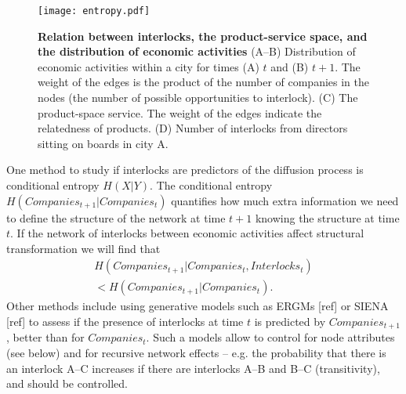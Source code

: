 \begin{figure}
\begin{center}
\texttt{[image: entropy.pdf]}
\caption{\textbf{Relation between interlocks, the product-service space, and the distribution of economic activities} (A--B) Distribution of economic activities within a city for times (A) $t$ and (B) $t+1$. The weight of the edges is the product of the number of companies in the nodes (the number of possible opportunities to interlock). (C) The product-space service. The weight of the edges indicate the relatedness of products. (D) Number of interlocks from directors sitting on boards in city A.}
\label{fig:entropy}
\end{center}
\end{figure}

One method to study if interlocks are predictors of the diffusion process is conditional entropy $H(X|Y)$.
The conditional entropy  $H(Companies_{t+1}|Companies_{t})$ quantifies how much extra information we need to define the structure of the network at time $t+1$ knowing the structure at time $t$. 
If the network of interlocks between economic activities affect structural transformation we will find that 
\begin{equation}
\begin{split}
H(Companies_{t+1}|Companies_{t},Interlocks_{t}) \\
< H(Companies_{t+1}|Companies_{t}).
\end{split}
\end{equation}
Other methods include using generative models such as ERGMs [ref] or SIENA [ref] to assess if the presence of interlocks at time $t$ is predicted by $Companies_{t+1}$,
better than for $Companies_{t}$.
Such a models allow to control for node attributes (see below) and for recursive network effects 
-- e.g. the probability that there is an interlock A--C increases if there are interlocks A--B and B--C (transitivity), and should be controlled.

